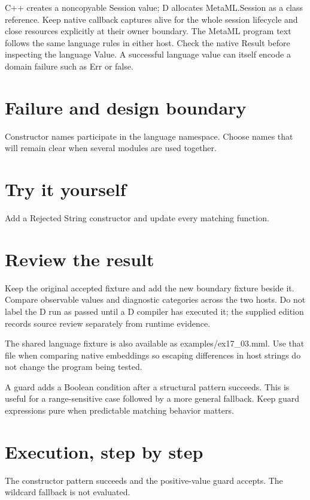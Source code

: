 \clearpage
{}
C++ creates a noncopyable Session value; D allocates MetaML.Session as a class reference. Keep native callback captures alive for the whole session lifecycle and close resources explicitly at their owner boundary. The MetaML program text follows the same language rules in either host. Check the native Result before inspecting the language Value. A successful language value can itself encode a domain failure such as Err or false.


\section*{Failure and design boundary}
Constructor names participate in the language namespace. Choose names that will remain clear when several modules are used together.

\section*{Try it yourself}
Add a Rejected String constructor and update every matching function.

\section*{Review the result}
Keep the original accepted fixture and add the new boundary fixture beside it. Compare observable values and diagnostic categories across the two hosts. Do not label the D run as passed until a D compiler has executed it; the supplied edition records source review separately from runtime evidence.

The shared language fixture is also available as examples/ex17\_03.mml. Use that file when comparing native embeddings so escaping differences in host strings do not change the program being tested.

\clearpage
{}
A guard adds a Boolean condition after a structural pattern succeeds. This is useful for a range-sensitive case followed by a more general fallback. Keep guard expressions pure when predictable matching behavior matters.


\section*{Execution, step by step}
The constructor pattern succeeds and the positive-value guard accepts. The wildcard fallback is not evaluated.

